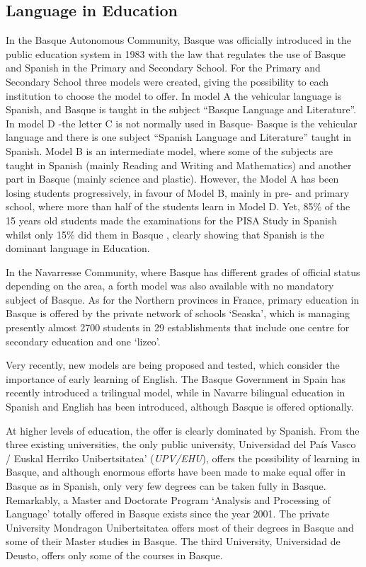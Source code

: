 \begin{multicols}{2}
\subsection{Language in Education}
    In the Basque Autonomous Community, Basque was officially introduced in the public education system in 1983 with the law that regulates the use of Basque and Spanish in the Primary and Secondary School. For the Primary and Secondary School three models were created, giving the possibility to each institution to choose the model to offer. In model A the vehicular language is Spanish, and Basque is taught in the subject “Basque Language and Literature”. In model D -the letter C is not normally used in Basque- Basque is the vehicular language and there is one subject “Spanish Language and Literature” taught in Spanish. Model B is an intermediate model, where some of the subjects are taught in Spanish (mainly Reading and Writing and Mathematics) and another part in Basque (mainly science and plastic). However, the Model A has been losing students progressively, in favour of Model B, mainly in pre- and primary school, where more than half of the students learn in Model D. Yet, 85\% of the 15 years old students made the examinations for the PISA Study in Spanish whilst only 15\% did them in Basque \cite{BAS-Nota12}, clearly showing that Spanish is the dominant language in Education. 

In the Navarresse Community, where Basque has different grades of official status depending on the area, a forth model was also available with no mandatory subject of Basque. As for the Northern provinces in France, primary education in Basque is offered by the private network of schools ‘Seaska’, which is managing presently almost 2700 students in 29 establishments that include one centre for secondary education and one ‘lizeo’. 

Very recently, new models are being proposed and tested, which consider the importance of early learning of English. The Basque Government in Spain has recently introduced a trilingual model, while in Navarre bilingual education in Spanish and English has been introduced, although Basque is offered optionally. 

At higher levels of education, the offer is clearly dominated by Spanish. From the three existing universities, the only public university, Universidad del País Vasco / Euskal Herriko Unibertsitatea’ (\textit{UPV/EHU}), offers the possibility of learning in Basque, and although enormous efforts have been made to make equal offer in Basque as in Spanish, only very few degrees can be taken fully in Basque. Remarkably, a Master and Doctorate Program ‘Analysis and Processing of Language’ \cite{BAS-Nota13}  totally offered in Basque exists since the year 2001.  The private University Mondragon Unibertsitatea offers most of their degrees in Basque and some of their Master studies in Basque. The third University, Universidad de Deusto, offers only some of the courses in Basque.


\end{multicols}
